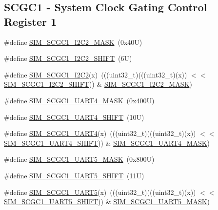 \subsection*{S\+C\+G\+C1 -\/ System Clock Gating Control Register 1}
\begin{DoxyCompactItemize}
\item 
\#define \mbox{\hyperlink{group___s_i_m___register___masks_ga69a2d83139dbf6c8556ea12093541809}{S\+I\+M\+\_\+\+S\+C\+G\+C1\+\_\+\+I2\+C2\+\_\+\+M\+A\+SK}}~(0x40\+U)
\item 
\#define \mbox{\hyperlink{group___s_i_m___register___masks_ga38f9e5095d2d1d847970da85e390e7f9}{S\+I\+M\+\_\+\+S\+C\+G\+C1\+\_\+\+I2\+C2\+\_\+\+S\+H\+I\+FT}}~(6\+U)
\item 
\#define \mbox{\hyperlink{group___s_i_m___register___masks_ga7919487cb069fab3039159d86274b10d}{S\+I\+M\+\_\+\+S\+C\+G\+C1\+\_\+\+I2\+C2}}(x)~(((uint32\+\_\+t)(((uint32\+\_\+t)(x)) $<$$<$ \mbox{\hyperlink{group___s_i_m___register___masks_ga38f9e5095d2d1d847970da85e390e7f9}{S\+I\+M\+\_\+\+S\+C\+G\+C1\+\_\+\+I2\+C2\+\_\+\+S\+H\+I\+FT}})) \& \mbox{\hyperlink{group___s_i_m___register___masks_ga69a2d83139dbf6c8556ea12093541809}{S\+I\+M\+\_\+\+S\+C\+G\+C1\+\_\+\+I2\+C2\+\_\+\+M\+A\+SK}})
\item 
\#define \mbox{\hyperlink{group___s_i_m___register___masks_ga8f954b824205f507499799ba8262b366}{S\+I\+M\+\_\+\+S\+C\+G\+C1\+\_\+\+U\+A\+R\+T4\+\_\+\+M\+A\+SK}}~(0x400\+U)
\item 
\#define \mbox{\hyperlink{group___s_i_m___register___masks_ga0808f41650f2b3824b779bf4f2273f08}{S\+I\+M\+\_\+\+S\+C\+G\+C1\+\_\+\+U\+A\+R\+T4\+\_\+\+S\+H\+I\+FT}}~(10\+U)
\item 
\#define \mbox{\hyperlink{group___s_i_m___register___masks_gacb6b97442cd1a1400c645e10f379cccf}{S\+I\+M\+\_\+\+S\+C\+G\+C1\+\_\+\+U\+A\+R\+T4}}(x)~(((uint32\+\_\+t)(((uint32\+\_\+t)(x)) $<$$<$ \mbox{\hyperlink{group___s_i_m___register___masks_ga0808f41650f2b3824b779bf4f2273f08}{S\+I\+M\+\_\+\+S\+C\+G\+C1\+\_\+\+U\+A\+R\+T4\+\_\+\+S\+H\+I\+FT}})) \& \mbox{\hyperlink{group___s_i_m___register___masks_ga8f954b824205f507499799ba8262b366}{S\+I\+M\+\_\+\+S\+C\+G\+C1\+\_\+\+U\+A\+R\+T4\+\_\+\+M\+A\+SK}})
\item 
\#define \mbox{\hyperlink{group___s_i_m___register___masks_ga6d5168e1b4f532ad0d6e3836dd5560f3}{S\+I\+M\+\_\+\+S\+C\+G\+C1\+\_\+\+U\+A\+R\+T5\+\_\+\+M\+A\+SK}}~(0x800\+U)
\item 
\#define \mbox{\hyperlink{group___s_i_m___register___masks_ga7a43287402d14ab06bb187be3fe36769}{S\+I\+M\+\_\+\+S\+C\+G\+C1\+\_\+\+U\+A\+R\+T5\+\_\+\+S\+H\+I\+FT}}~(11\+U)
\item 
\#define \mbox{\hyperlink{group___s_i_m___register___masks_gad50e05dc74c92dd4e42f999c079b8e25}{S\+I\+M\+\_\+\+S\+C\+G\+C1\+\_\+\+U\+A\+R\+T5}}(x)~(((uint32\+\_\+t)(((uint32\+\_\+t)(x)) $<$$<$ \mbox{\hyperlink{group___s_i_m___register___masks_ga7a43287402d14ab06bb187be3fe36769}{S\+I\+M\+\_\+\+S\+C\+G\+C1\+\_\+\+U\+A\+R\+T5\+\_\+\+S\+H\+I\+FT}})) \& \mbox{\hyperlink{group___s_i_m___register___masks_ga6d5168e1b4f532ad0d6e3836dd5560f3}{S\+I\+M\+\_\+\+S\+C\+G\+C1\+\_\+\+U\+A\+R\+T5\+\_\+\+M\+A\+SK}})
\end{DoxyCompactItemize}
